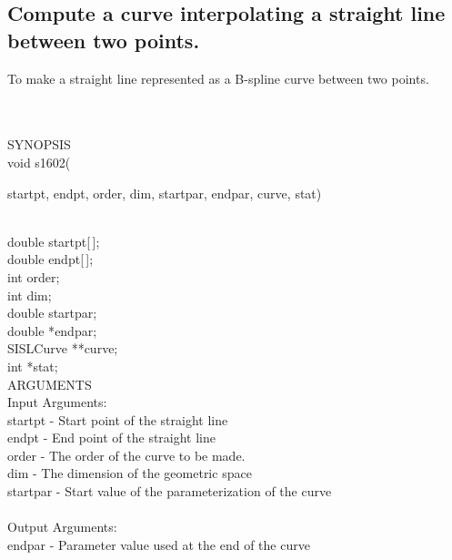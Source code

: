 \subsection{Compute a curve interpolating a straight line between two points.}
\begin{minipg1}
To make a straight line represented as a B-spline curve between two points.
\end{minipg1}\\ \\
SYNOPSIS\\
        \>void s1602(\begin{minipg3}
                {\fov startpt}, {\fov endpt}, {\fov order}, {\fov dim}, {\fov startpar}, {\fov endpar},
                {\fov curve}, {\fov stat})
                \end{minipg3}\\[0.3ex]
                \>\>    double  \>      {\fov startpt}[\,];\\
                \>\>    double  \>      {\fov endpt}[\,];\\
                \>\>    int     \>      {\fov order};\\
                \>\>    int     \>      {\fov dim};\\
                \>\>    double  \>      {\fov startpar};\\
                \>\>    double  \>      *{\fov endpar};\\
                \>\>    SISLCurve       \>      **{\fov curve};\\
                \>\>    int     \>      *{\fov stat};\\
\newpagetabs
ARGUMENTS\\
        \>Input Arguments:\\
        \>\>    {\fov startpt}  \> - \> Start point of the straight line\\
        \>\>    {\fov endpt}    \> - \> End point of the straight line\\
        \>\>    {\fov order}    \> - \> The order of the curve to be made.\\
        \>\>    {\fov dim}      \> - \> The dimension of the geometric space\\
        \>\>    {\fov startpar} \> - \> Start value of the parameterization of the curve\\
\\
        \>Output Arguments:\\
        \>\>    {\fov endpar }\> - \>   Parameter value used at the end of the curve\\

